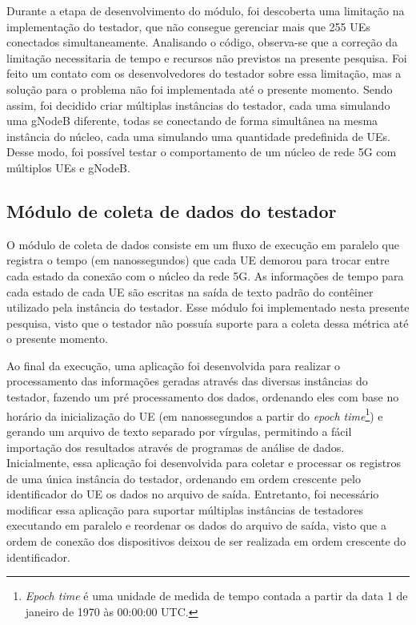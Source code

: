 Durante a etapa de desenvolvimento do módulo, foi descoberta uma limitação na implementação do testador, que não consegue gerenciar mais que 255 UEs conectados simultaneamente.
Analisando o código, observa-se que a correção da limitação necessitaria de tempo e recursos não previstos na presente pesquisa.
Foi feito um contato com os desenvolvedores do testador sobre essa limitação, mas a solução para o problema não foi implementada até o presente momento.
Sendo assim, foi decidido criar múltiplas instâncias do testador, cada uma simulando uma gNodeB diferente, todas se conectando de forma simultânea na mesma instância do núcleo, cada uma simulando uma quantidade predefinida de UEs.
Desse modo, foi possível testar o comportamento de um núcleo de rede 5G com múltiplos UEs e gNodeB.

\subsection{Módulo de coleta de dados do testador}

O módulo de coleta de dados consiste em um fluxo de execução em paralelo que registra o tempo (em nanossegundos) que cada UE demorou para trocar entre cada estado da conexão com o núcleo da rede 5G.
As informações de tempo para cada estado de cada UE são escritas na saída de texto padrão do contêiner utilizado pela instância do testador.
Esse módulo foi implementado nesta presente pesquisa, visto que o testador não possuía suporte para a coleta dessa métrica até o presente momento.

Ao final da execução, uma aplicação foi desenvolvida para realizar o processamento das informações geradas através das diversas instâncias do testador, fazendo um pré processamento dos dados, ordenando eles com base no horário da inicialização do UE (em nanossegundos a partir do \textit{epoch time}\footnote{\textit{Epoch time} é uma unidade de medida de tempo contada a partir da data 1 de janeiro de 1970 às 00:00:00 UTC.}) e gerando um arquivo de texto separado por vírgulas, permitindo a fácil importação dos resultados através de programas de análise de dados.
Inicialmente, essa aplicação foi desenvolvida para coletar e processar os registros de uma única instância do testador, ordenando em ordem crescente pelo identificador do UE os dados no arquivo de saída.
Entretanto, foi necessário modificar essa aplicação para suportar múltiplas instâncias de testadores executando em paralelo e reordenar os dados do arquivo de saída, visto que a ordem de conexão dos dispositivos deixou de ser realizada em ordem crescente do identificador.

